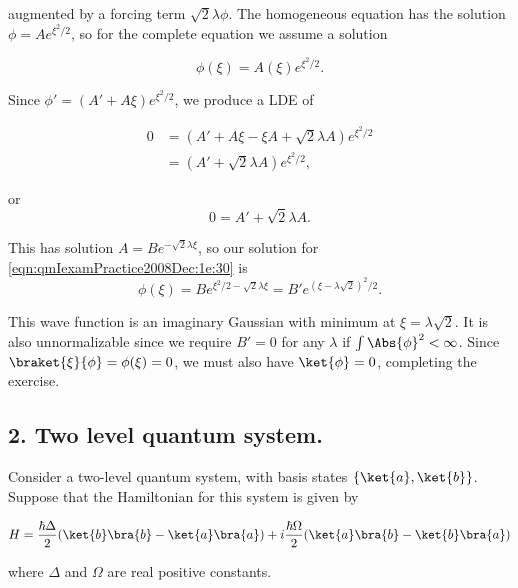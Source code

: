 augmented by a forcing term $\sqrt{2}\lambda \phi$.  The homogeneous equation has the solution $\phi = A e^{\xi^2/2}$, so for the complete equation we assume a solution 

\begin{equation}\label{eqn:qmIexamPractice2008Dec:1e:50}
\phi(\xi) = A(\xi) e^{\xi^2/2}.
\end{equation}

Since $\phi' = (A' + A \xi) e^{\xi^2/2}$, we produce a LDE of

\begin{align*}
0 &= (A' + A \xi -\xi A + \sqrt{2} \lambda A ) e^{\xi^2/2} \\
&= (A' + \sqrt{2} \lambda A ) e^{\xi^2/2},
\end{align*}

or
\begin{equation}\label{eqn:qmIexamPractice2008Dec:1e:60}
0 = A' + \sqrt{2} \lambda A.
\end{equation}

This has solution $A = B e^{-\sqrt{2} \lambda \xi}$, so our solution for \ref{eqn:qmIexamPractice2008Dec:1e:30} is
\begin{equation}\label{eqn:qmIexamPractice2008Dec:1e:70}
\phi(\xi) = B e^{\xi^2/2 - \sqrt{2} \lambda \xi} 
= B' e^{ (\xi - \lambda \sqrt{2} )^2/2}.
\end{equation}

This wave function is an imaginary Gaussian with minimum at $\xi = \lambda\sqrt{2}$.  It is also unnormalizable since we require $B' = 0$ for any $\lambda$ if $\int \Abs{\phi}^2 < \infty$.  Since $\braket{\xi}{\phi} = \phi(\xi) = 0$, we must also have $\ket{\phi} = 0$, completing the exercise.

\subsection{2.  Two level quantum system.}

Consider a two-level quantum system, with basis states $\{\ket{a}, \ket{b}\}$.  Suppose that the Hamiltonian for this system is given by

\begin{equation}\label{eqn:qmIexamPractice2008Dec:2:10}
H = 
\frac{\hbar \Delta}{2} ( 
\ket{b}\bra{b}
- \ket{a}\bra{a}
)
+ i \frac{\hbar \Omega}{2} ( 
\ket{a}\bra{b}
- \ket{b}\bra{a}
)
\end{equation}

where $\Delta$ and $\Omega$ are real positive constants.

